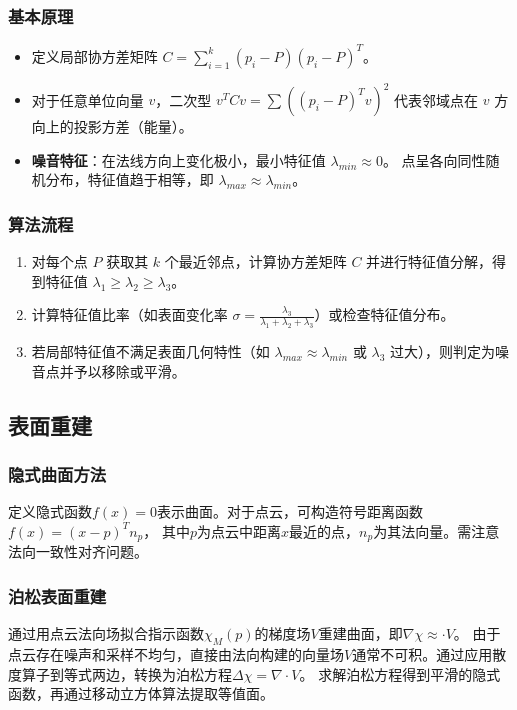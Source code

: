 \documentclass[12pt]{article}
\begin{document}
\subsubsection{基本原理}
\begin{itemize}
    \item 定义局部协方差矩阵 $C = \sum_{i=1}^{k} (p_i - P)(p_i - P)^T$。
    \item 对于任意单位向量 $v$，二次型 $v^T C v = \sum ((p_i - P)^T v)^2$ 代表邻域点在 $v$ 方向上的投影方差（能量）。
    \item \textbf{噪音特征}：在法线方向上变化极小，最小特征值 $\lambda_{min} \approx 0$。
    点呈各向同性随机分布，特征值趋于相等，即 $\lambda_{max} \approx \lambda_{min}$。
\end{itemize}

\subsubsection{算法流程}
\begin{enumerate}
    \item 对每个点 $P$ 获取其 $k$ 个最近邻点，计算协方差矩阵 $C$ 并进行特征值分解，得到特征值 $\lambda_1 \ge \lambda_2 \ge \lambda_3$。
    \item 计算特征值比率（如表面变化率 $\sigma = \frac{\lambda_3}{\lambda_1 + \lambda_2 + \lambda_3}$）或检查特征值分布。
    \item 若局部特征值不满足表面几何特性（如 $\lambda_{max} \approx \lambda_{min}$ 或 $\lambda_3$ 过大），则判定为噪音点并予以移除或平滑。
\end{enumerate}

\subsection{表面重建}

\subsubsection{隐式曲面方法}
定义隐式函数$f(x) = 0$表示曲面。对于点云，可构造符号距离函数$f(x) = (x - p)^T n_p$，
其中$p$为点云中距离$x$最近的点，$n_p$为其法向量。需注意法向一致性对齐问题。

\subsubsection{泊松表面重建}
通过用点云法向场拟合指示函数$\chi_M(p)$的梯度场$V$重建曲面，即$\nabla \chi \approx \cdot V$。
由于点云存在噪声和采样不均匀，直接由法向构建的向量场$V$通常不可积。通过应用散度算子到等式两边，转换为泊松方程$\Delta \chi = \nabla \cdot V$。
求解泊松方程得到平滑的隐式函数，再通过移动立方体算法提取等值面。
\end{document}
